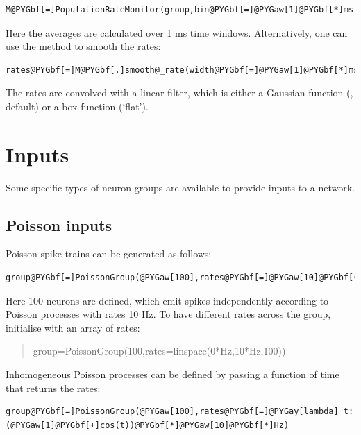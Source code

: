 \documentclass[letterpaper,10pt,english]{manual}
\begin{document}
\begin{Verbatim}[commandchars=@\[\]]
M@PYGbf[=]PopulationRateMonitor(group,bin@PYGbf[=]@PYGaw[1]@PYGbf[*]ms)
\end{Verbatim}

Here the averages are calculated over 1 ms time windows. Alternatively, one can use the
 method to smooth the rates:

\begin{Verbatim}[commandchars=@\[\]]
rates@PYGbf[=]M@PYGbf[.]smooth@_rate(width@PYGbf[=]@PYGaw[1]@PYGbf[*]ms,@PYGaX[filter]@PYGbf[=]@PYGad[']@PYGad[gaussian]@PYGad['])
\end{Verbatim}

The rates are convolved with a linear filter, which is either a Gaussian function
(, default) or a box function (`flat').

\resetcurrentobjects
\hypertarget{--doc-inputs}{}

\section{Inputs}

Some specific types of neuron groups are available to provide inputs to a network.


\subsection{Poisson inputs}

Poisson spike trains can be generated as follows:

\begin{Verbatim}[commandchars=@\[\]]
group@PYGbf[=]PoissonGroup(@PYGaw[100],rates@PYGbf[=]@PYGaw[10]@PYGbf[*]Hz)
\end{Verbatim}

Here 100 neurons are defined, which emit spikes independently according to Poisson
processes with rates 10 Hz. To have different rates across the group,
initialise with an array of rates:
\begin{quote}

group=PoissonGroup(100,rates=linspace(0*Hz,10*Hz,100))
\end{quote}

Inhomogeneous Poisson processes can be defined by passing a function of time that returns the
rates:

\begin{Verbatim}[commandchars=@\[\]]
group@PYGbf[=]PoissonGroup(@PYGaw[100],rates@PYGbf[=]@PYGay[lambda] t:(@PYGaw[1]@PYGbf[+]cos(t))@PYGbf[*]@PYGaw[10]@PYGbf[*]Hz)
\end{Verbatim}
\end{document}
